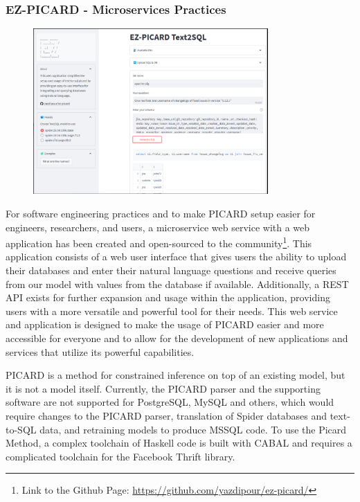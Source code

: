 \subsubsection{EZ-PICARD - Microservices Practices}

\begin{figure}[H]
    \centering
    \includegraphics[width=0.8\textwidth]{pics/ez/ui.png}
    \label{fig:ezpicard}
\end{figure}

For software engineering practices and to make PICARD setup easier for engineers, researchers, and users, a microservice web service with a web application has been created and open-sourced to the community\footnote[1]{Link to the Github Page: \url{https://github.com/yazdipour/ez-picard/}}. This application consists of a web user interface that gives users the ability to upload their databases and enter their natural language questions and receive queries from our model with values from the database if available. Additionally, a REST API exists for further expansion and usage within the application, providing users with a more versatile and powerful tool for their needs. This web service and application is designed to make the usage of PICARD easier and more accessible for everyone and to allow for the development of new applications and services that utilize its powerful capabilities.

PICARD is a method for constrained inference on top of an existing model, but it is not a model itself. Currently, the PICARD parser and the supporting software are not supported for PostgreSQL, MySQL and others, which would require changes to the PICARD parser, translation of Spider databases and text-to-SQL data, and retraining models to produce MSSQL code. To use the Picard Method, a complex toolchain of Haskell code is built with CABAL and requires a complicated toolchain for the Facebook Thrift library.

